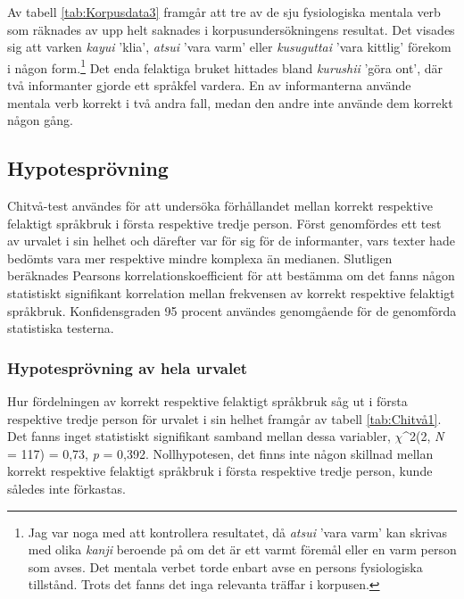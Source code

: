 \documentclass[12pt,a4paper]{article}
\begin{document}
\noindent
Av tabell \ref{tab:Korpusdata3} framgår att tre av de sju fysiologiska mentala verb som räknades av upp \textcite{makino1986} helt saknades i korpusundersökningens resultat. Det visades sig att varken \emph{kayui} 'klia', \emph{atsui} 'vara varm' eller \emph{kusuguttai} 'vara kittlig' förekom i någon form.\footnote{Jag var noga med att kontrollera resultatet, då \emph{atsui} 'vara varm' kan skrivas med olika \emph{kanji} beroende på om det är ett varmt föremål eller en varm person som avses. Det mentala verbet torde enbart avse en persons fysiologiska tillstånd. Trots det fanns det inga relevanta träffar i korpusen.} Det enda felaktiga bruket hittades bland \emph{kurushii} 'göra ont', där två informanter gjorde ett språkfel vardera. En av informanterna använde mentala verb korrekt i två andra fall, medan den andre inte använde dem korrekt någon gång.

\subsection{Hypotesprövning}
\label{sec:Resultat: Hypotesprövning}
Chitvå-test användes för att undersöka förhållandet mellan korrekt respektive felaktigt språkbruk i första respektive tredje person. Först genomfördes ett test av urvalet i sin helhet och därefter var för sig för de informanter, vars texter hade bedömts vara mer respektive mindre komplexa än medianen. Slutligen beräknades Pearsons korrelationskoefficient för att bestämma om det fanns någon statistiskt signifikant korrelation mellan frekvensen av korrekt respektive felaktigt språkbruk. Konfidensgraden 95 procent användes genomgående för de genomförda statistiska testerna.

\subsubsection{Hypotesprövning av hela urvalet}
\label{subsec:Resultat: Hypotesprövning: Hypotesprövning av hela urvalet}
Hur fördelningen av korrekt respektive felaktigt språkbruk såg ut i första respektive tredje person för urvalet i sin helhet framgår av tabell \ref{tab:Chitvå1}. Det fanns inget statistiskt signifikant samband mellan dessa variabler, $\chi$^{2}(2, \emph{N} = 117) = 0,73, \emph{p} = 0,392. Nollhypotesen, det finns inte någon skillnad mellan korrekt respektive felaktigt språkbruk i första respektive tredje person, kunde således inte förkastas.
\end{document}
